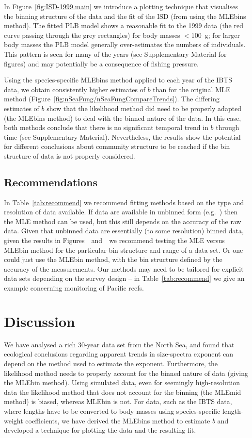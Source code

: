 In Figure~\ref{fig:ISD-1999.main} we introduce a plotting technique
that visualises the binning structure of the data and the fit of the ISD
(from using the MLEbins method).
The fitted PLB model shows
a reasonable fit to the 1999 data (the red curve passing through the grey
rectangles) for body masses $<100$~g; for larger body masses the PLB model
generally over-estimates the numbers of individuals. This pattern is seen for
many of the years (see Supplementary Material for figures)
and may potentially be a consequence of fishing pressure.


Using the species-specific MLEbins method applied to each year of the IBTS data, we obtain
consistently higher estimates of $b$ than for the original MLE method
(Figure~\ref{fig:nSeaFung/nSeaFungCompareTrends}).
The differing estimates of $b$ show that the likelihood method did need to be
properly adapted (the MLEbins method) to deal with the binned nature of the
data.
In this case, both methods conclude that there is no significant temporal trend
in $b$ through time (see Supplementary Material). Nevertheless, the results show
the potential for different conclusions about community structure to be reached
if the bin structure of data is not properly considered.

\subsection{Recommendations}

In Table~\ref{tab:recommend} we recommend fitting methods based on the type
and resolution of data available.
If data are available in unbinned form (e.g.~\citealt{tdss15})
then the MLE method can be used, but this still depends on the accuracy of the raw
data. Given that unbinned data are
essentially (to some resolution) binned data,
given the results in Figures~\fitMLEhists\ and~\fitMLEconfs\ we recommend
testing the MLE versus MLEbin method for the particular bin structure and range
of a data set.
Or one could just use the MLEbin method, with the bin structure
defined by the accuracy of the measurements.
Our methods may need to be tailored for explicit data sets depending on the
survey design -- in Table~\ref{tab:recommend} we give an example concerning
monitoring of Pacific reefs.

\section{Discussion}

We have analysed a rich 30-year data set from the North Sea, and found that
ecological conclusions regarding apparent trends in size-spectra exponent can depend on
the method used to estimate the exponent. Furthermore, the likelihood method
needs to properly account for the binned nature of data (giving the MLEbin
method). Using simulated data, even for
seemingly high-resolution data the likelihood method that does not account for
the binning (the MLEmid method) is biased, whereas MLEbin is not.
For data, such as the IBTS data, where lengths have to be converted to body
masses using species-specific length-weight coefficients, we have derived
the MLEbins method to estimate $b$ and developed a technique for plotting the
data and the resulting fit.

